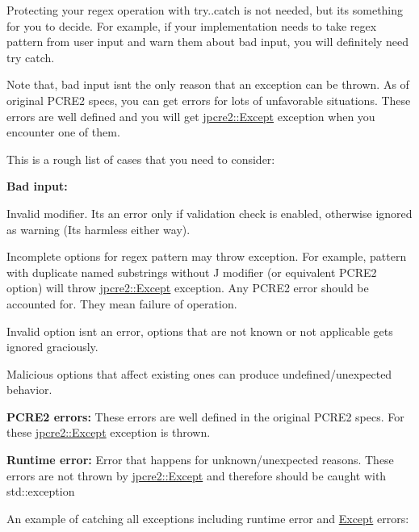 Protecting your regex operation with try..catch is not needed, but it\textquotesingle{}s something for you to decide. For example, if your implementation needs to take regex pattern from user input and warn them about bad input, you will definitely need try catch.

Note that, bad input isn\textquotesingle{}t the only reason that an exception can be thrown. As of original P\+C\+R\+E2 specs, you can get errors for lots of unfavorable situations. These errors are well defined and you will get {\ttfamily \hyperlink{classjpcre2_1_1Except}{jpcre2\+::\+Except}} exception when you encounter one of them.

This is a rough list of cases that you need to consider\+:


\begin{DoxyEnumerate}
\item {\bfseries Bad input\+:}
\begin{DoxyEnumerate}
\item Invalid modifier. It\textquotesingle{}s an error only if validation check is enabled, otherwise ignored as warning (It\textquotesingle{}s harmless either way).
\item Incomplete options for regex pattern may throw exception. For example, pattern with duplicate named substrings without \textquotesingle{}J\textquotesingle{} modifier (or equivalent P\+C\+R\+E2 option) will throw {\ttfamily \hyperlink{classjpcre2_1_1Except}{jpcre2\+::\+Except}} exception. Any P\+C\+R\+E2 error should be accounted for. They mean failure of operation.
\item Invalid option isn\textquotesingle{}t an error, options that are not known or not applicable gets ignored graciously.
\item Malicious options that affect existing ones can produce undefined/unexpected behavior.
\end{DoxyEnumerate}
\item {\bfseries P\+C\+R\+E2 errors\+:} These errors are well defined in the original P\+C\+R\+E2 specs. For these {\ttfamily \hyperlink{classjpcre2_1_1Except}{jpcre2\+::\+Except}} exception is thrown.
\item {\bfseries Runtime error\+:} Error that happens for unknown/unexpected reasons. These errors are not thrown by {\ttfamily \hyperlink{classjpcre2_1_1Except}{jpcre2\+::\+Except}} and therefore should be caught with {\ttfamily std\+::exception}
\end{DoxyEnumerate}

An example of catching all exceptions including runtime error and \hyperlink{classjpcre2_1_1Except}{Except} errors\+:


